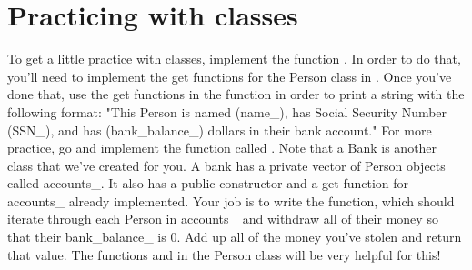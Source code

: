 \documentclass{tufte-handout}
\begin{document}
\section{Practicing with classes}

To get a little practice with classes, implement the function . In order to do that, you'll need to implement the get functions for the Person class in . Once you've done that, use the get functions in the  function in order to print a string with the following format: \newline
\medskip
\noindent "This Person is named (name\_), has Social Security Number (SSN\_), 
and has (bank\_balance\_) dollars in their bank account." \newline
\medskip
\noindent For more practice, go  and implement the function called . Note that a Bank is another class that we've created for you.
A bank has a private vector of Person objects called accounts\_. It also has a public constructor and a get function for accounts\_ already implemented. 
Your job is to write the  function, which should iterate through each Person in accounts\_ and withdraw all of their money so that their bank\_balance\_ is 0. Add up all of the money you've stolen and return that value. The functions  and  in the Person class will be very helpful for this!
\end{document}

